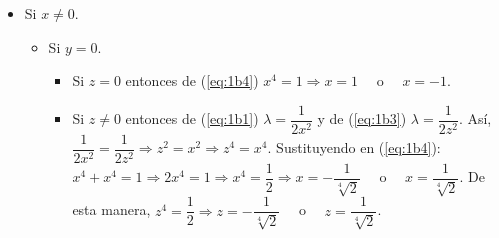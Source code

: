 \documentclass[fleqn, 12pt]{article}
\begin{document}
\begin{list}{\bfseries Ejercicio}{ \addtolength{\itemindent}{-1mm}%
    \addtolength{\labelsep}{-1mm}%
    \addtolength{\leftmargin}{-1cm}%
    \addtolength{\labelwidth}{-1cm} }
\begin{enumerate}[a)]
\begin{itemize}
\begin{itemize}
                \item Si $ y \neq 0 $.
                \begin{itemize}
                    \item Si $ z = 0 $ entonces de (\ref{eq:1b4}) \; $ y^4 = 1 \Longrightarrow y = 1 \quad $ o $ \quad y = -1 $.
                    \item Si $ z \neq 0 $ entonces de (\ref{eq:1b2}) $ \lambda = \dfrac{1}{2y^2} $ y de (\ref{eq:1b3}) $ \lambda = \dfrac{1}{2z^2} $. Así, $ \dfrac{1}{2y^2} = \dfrac{1}{2z^2} \Longrightarrow z^2 = y^2 \Longrightarrow z^4 = y^4 $. Sustituyendo en (\ref{eq:1b4}): $ y^4 + y^4 = 1 \Longrightarrow 2y^4 = 1 \Longrightarrow y^4 = \dfrac{1}{2} \Longrightarrow y = - \dfrac{1}{\sqrt[4]{2}} \quad $ o $ \quad y = \dfrac{1}{\sqrt[4]{2}} $. De esta manera, $ z^4 = \dfrac{1}{2} \Longrightarrow z = - \dfrac{1}{\sqrt[4]{2}} \quad $ o $ \quad z = \dfrac{1}{\sqrt[4]{2}} $.
                \end{itemize}
            \end{itemize}

            \item Si $ x \neq 0 $.
            \begin{itemize}
                \item Si $ y = 0 $.
                \begin{itemize}
                    \item Si $ z = 0 $ entonces de (\ref{eq:1b4}) \; $ x^4 = 1 \Longrightarrow x = 1 \quad $ o $ \quad x = -1 $.
                    \item Si $ z \neq 0 $ entonces de (\ref{eq:1b1}) $ \lambda = \dfrac{1}{2x^2} $ y de (\ref{eq:1b3}) $ \lambda = \dfrac{1}{2z^2} $. Así, $ \dfrac{1}{2x^2} = \dfrac{1}{2z^2} \Longrightarrow z^2 = x^2 \Longrightarrow z^4 = x^4 $. Sustituyendo en (\ref{eq:1b4}): $ x^4 + x^4 = 1 \Longrightarrow 2x^4 = 1 \Longrightarrow x^4 = \dfrac{1}{2} \Longrightarrow x = - \dfrac{1}{\sqrt[4]{2}} \quad $ o $ \quad x = \dfrac{1}{\sqrt[4]{2}} $. De esta manera, $ z^4 = \dfrac{1}{2} \Longrightarrow z = - \dfrac{1}{\sqrt[4]{2}} \quad $ o $ \quad z = \dfrac{1}{\sqrt[4]{2}} $.
                \end{itemize}


\end{itemize}
\end{itemize}
\end{enumerate}
\end{list}
\end{document}
